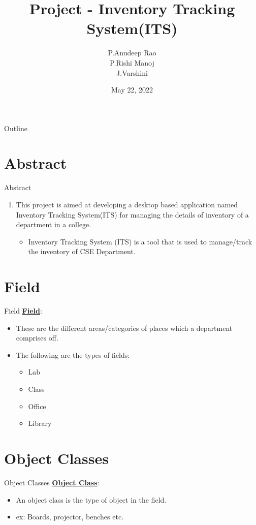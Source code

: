 \documentclass{beamer}
\title{Project - Inventory Tracking System(ITS)}
\author{P.Anudeep Rao \\ P.Rishi Manoj \\ J.Varshini}
\date{May 22, 2022}
\begin{document}
\begin{frame}
    \titlepage 
\end{frame}


\begin{frame}{Outline}
    \tableofcontents
\end{frame}

\section{Abstract}
\begin{frame}{Abstract}
    \begin{enumerate}[]
        \item This project is aimed at developing a desktop based application named Inventory Tracking System(ITS) for managing the details of inventory of a department in a college.
        \begin{itemize}
            \item Inventory Tracking System (ITS) is a tool that is used to manage/track the inventory of CSE Department.
        \end{itemize}
    \end{enumerate}
\end{frame}


\section{Field}
\begin{frame}{Field}
	\underline{\textbf{Field}}: \\
\begin{itemize}
\item These are the different areas/categories of places which a department comprises off.
\item The following are the types of fields:
\begin{itemize}
\item Lab
\item Class
\item Office
\item Library
\end{itemize} 
\end{itemize}
\end{frame}

\section{Object Classes}
\begin{frame}{Object Classes}
	\underline{\textbf{Object Class}}: \\
	\begin{itemize}
	\item An object class is the type of object in the field.
	\item ex: Boards, projector, benches etc.
	\end{itemize}
\end{frame}
\end{document}
